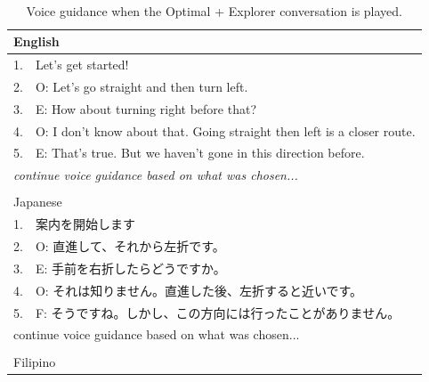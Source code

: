 \begin{table}[h]
\centering
\caption{Voice guidance when the Optimal + Explorer conversation is played.}~\label{tab:b-OE}
\begin{tabular}{ll}
\hline
\multicolumn{2}{l}{English}                                                             \\ \hline
1.                      & Let's get started!                                            \\ \hline
\multicolumn{1}{|l}{2.} & \multicolumn{1}{l|}{O: Let's go straight and then turn left.} \\
\multicolumn{1}{|l}{3.} & \multicolumn{1}{l|}{E: How about turning right before that?}  \\
\multicolumn{1}{|l}{4.} & \multicolumn{1}{l|}{O: I don't know about that. Going straight then left is a closer route.} \\
\multicolumn{1}{|l}{5.} & \multicolumn{1}{l|}{E: That's true. But we haven't gone in this direction before.}           \\ \hline
\multicolumn{2}{l}{\textit{continue voice guidance based on what was chosen...}}        \\
                        &                                                               \\ \hline
\multicolumn{2}{l}{Japanese}                                                            \\ \hline
1.                      & 案内を開始します                                                      \\ \hline
\multicolumn{1}{|l}{2.} & \multicolumn{1}{l|}{O: 直進して、それから左折です。}                        \\
\multicolumn{1}{|l}{3.} & \multicolumn{1}{l|}{E: 手前を右折したらどうですか。}                        \\
\multicolumn{1}{|l}{4.} & \multicolumn{1}{l|}{O: それは知りません。直進した後、左折すると近いです。}             \\
\multicolumn{1}{|l}{5.} & \multicolumn{1}{l|}{F: そうですね。しかし、この方向には行ったことがありません。}          \\ \hline
\multicolumn{2}{l}{continue voice guidance based on what was chosen...}                 \\
                        &                                                               \\ \hline
\multicolumn{2}{l}{Filipino}                                                            \\ \hline

\end{tabular}
\end{table}
